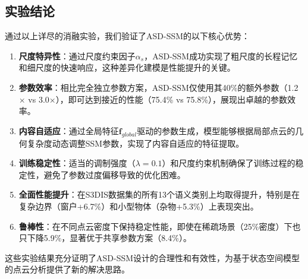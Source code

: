 \documentclass[preprint,12pt]{elsarticle}
\begin{document}
\subsection{实验结论}
通过以上详尽的消融实验，我们验证了ASD-SSM的以下核心优势：

\begin{enumerate}
	\item \textbf{尺度特异性}：通过尺度约束因子$\alpha_s$，ASD-SSM成功实现了粗尺度的长程记忆和细尺度的快速响应，这种差异化建模是性能提升的关键。
	
	\item \textbf{参数效率}：相比完全独立参数方案，ASD-SSM仅使用其40\%的额外参数（1.2$\times$ vs 3.0$\times$），即可达到接近的性能（75.4\% vs 75.8\%），展现出卓越的参数效率。
	
	\item \textbf{内容自适应}：通过全局特征$\mathbf{f}_{global}$驱动的参数生成，模型能够根据局部点云的几何复杂度动态调整SSM参数，实现了内容自适应的特征提取。
	
	\item \textbf{训练稳定性}：适当的调制强度（$\lambda=0.1$）和尺度约束机制确保了训练过程的稳定性，避免了参数过度偏移导致的优化困难。
	
	\item \textbf{全面性能提升}：在S3DIS数据集的所有13个语义类别上均取得提升，特别是在复杂边界（窗户+6.7\%）和小型物体（杂物+5.3\%）上表现突出。
	
	\item \textbf{鲁棒性}：在不同点云密度下保持稳定性能，即使在稀疏场景（25\%密度）下也只下降5.9\%，显著优于共享参数方案（8.4\%）。
\end{enumerate}

这些实验结果充分证明了ASD-SSM设计的合理性和有效性，为基于状态空间模型的点云分析提供了新的解决思路。
\end{document}

